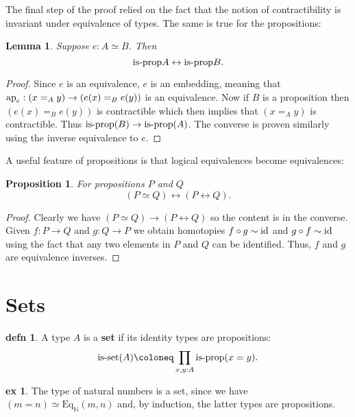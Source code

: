 \documentclass{amsart}
\theoremstyle{theorem}
\newtheorem*{lem}{Lemma}
\newtheorem*{prop}{Proposition}
\theoremstyle{definition}
\newtheorem*{defn}{defn}
\newtheorem*{ex}{ex}
\theoremstyle{remark}
\newcommand{\0}{\mathbbe{0}}
\newcommand{\1}{\mathbbe{1}}
\newcommand{\2}{\mathbbe{2}}
\newcommand{\3}{\mathbbe{3}}
\newcommand{\4}{\mathbbe{4}}
\newcommand{\term}[1]{{\textup{#1}}}
\newcommand{\type}[1]{{\textup{#1}}}
\newcommand{\id}{\term{id}}
\newcommand{\bN}{{\mathbb{N}}}
\newcommand{\ap}{\term{ap}}
\newcommand{\Eq}{\mathrm{Eq}}
\newcommand{\is}[1]{\type{is-{#1}}}
\newcommand{\isprop}{\type{is-prop}}
\renewcommand{\iff}{\leftrightarrow}
\begin{document}
The final step of the proof relied on the fact that the notion of contractibility is invariant under equivalence of types. The same is true for the propositions:

\begin{lem} Suppose $e : A\simeq B$. Then
\[ \isprop{A} \iff \isprop{B}.\]
\end{lem}

\begin{proof}
Since $e$ is an equivalence, $e$ is an embedding, meaning that $\ap_e : (x=_Ay) \to (e(x)=_B e(y))$ is an equivalence. Now if $B$ is a proposition then $(e(x)=_Be(y))$ is contractible which then implies that $(x=_Ay)$ is contractible. Thus $\isprop(B) \to \isprop(A)$. The converse is proven similarly using the inverse equivalence to $e$.
\end{proof}

A useful feature of propositions is that logical equivalences become equivalences:

\begin{prop} For propositions $P$ and $Q$
\[ (P \simeq Q) \iff (P \iff Q).\]
\end{prop}
\begin{proof}
Clearly we have $(P \simeq Q) \to (P \iff Q)$ so the content is in the converse. Given $f : P \to Q$ and $g : Q \to P$ we obtain homotopies $f \circ g \sim \id$ and $g \circ f \sim \id$ using the fact that any two elements in $P$ and $Q$ can be identified. Thus, $f$ and $g$ are equivalence inverses.
\end{proof}




\section*{Sets}

\begin{defn} A type $A$ is a \textbf{set} if its identity types are propositions:
\[ \is{set}(A) \coloneq \prod_{x,y:A} \isprop(x=y).\]
\end{defn}

\begin{ex} The type of natural numbers is a set, since we have $(m=n) \simeq \Eq_\bN(m,n)$ and, by induction, the latter types are propositions.
\end{ex}
\end{document}
